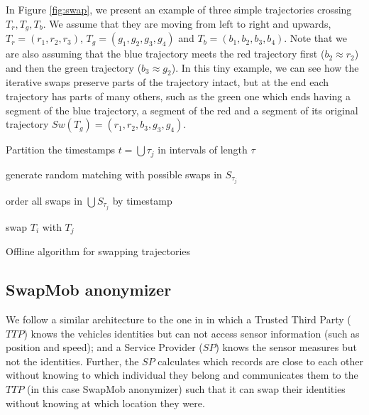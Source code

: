 \documentclass{llncs}
\begin{document}
In Figure \ref{fig:swap}, we present an example of three simple trajectories crossing $T_r, T_g, T_b$. We assume that they are moving from left to right and upwards, $T_r = (r_1, r_2, r_3)$, $T_g = (g_1, g_2, g_3, g_4)$ and $T_b = (b_1, b_2, b_3, b_4)$. Note that we are also assuming that the blue trajectory meets the red trajectory first ($b_2 \approx r_2$) and then the green trajectory ($b_3 \approx g_2$). In this tiny example, we can see how the iterative swaps preserve parts of the trajectory intact, but at the end each trajectory has parts of many others, such as the green one which ends having a segment of the blue trajectory, a segment of the red and a segment of its original trajectory $Sw(T_g)=(r_1, r_2, b_3, g_3, g_4)$.


\begin{algorithm}[t]
\SetAlgoNoLine
{}

Partition the timestamps $t =\bigcup \tau_j$ in intervals of length $\tau$

generate random matching with possible swaps in $S_{\tau_j}$\

order all swaps in $\bigcup S_{\tau_j}$ by timestamp\

{swap $T_i$ with $T_j$}

\caption{Offline algorithm for swapping trajectories}
\label{alg:one}
\end{algorithm}


\subsection{SwapMob anonymizer}

We follow a similar architecture to the one in \cite{Hoh06} in which a Trusted Third Party ($TTP$) knows the
vehicles identities but can not access sensor information (such as position and  speed); and a Service Provider ($SP$) knows the sensor measures but not the identities. 
Further, the $SP$ calculates which records are close to each other without knowing to which individual they belong and communicates them to the $TTP$ (in this case SwapMob anonymizer) such that it can swap their identities without knowing at which location they were.
\end{document}
